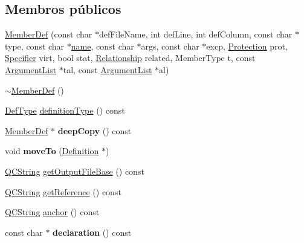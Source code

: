 \subsection*{Membros públicos}
\begin{DoxyCompactItemize}
\item 
\hyperlink{class_member_def_a99a23c621060bfd3d01cf65d5c235011}{Member\-Def} (const char $\ast$def\-File\-Name, int def\-Line, int def\-Column, const char $\ast$type, const char $\ast$\hyperlink{class_definition_a2c310e06c9aadc6fb218f80fcbb5c695}{name}, const char $\ast$args, const char $\ast$excp, \hyperlink{types_8h_a90e352184df58cd09455fe9996cd4ded}{Protection} prot, \hyperlink{types_8h_ab16236bdd10ddf4d73a9847350f0017e}{Specifier} virt, bool stat, \hyperlink{types_8h_a9d625fe894d9313ec78df1d78553f32e}{Relationship} related, Member\-Type t, const \hyperlink{class_argument_list}{Argument\-List} $\ast$tal, const \hyperlink{class_argument_list}{Argument\-List} $\ast$al)
\item 
\hyperlink{class_member_def_abf79fd4952640be8c59f27a53c56d0c9}{$\sim$\-Member\-Def} ()
\item 
\hyperlink{class_definition_intf_a2dc566dfec40397b2990e6520536ecb5}{Def\-Type} \hyperlink{class_member_def_aac410235a8bf90e471e649bd9dbf9c5e}{definition\-Type} () const 
\item 
\hypertarget{class_member_def_a58301c739a95a209f09029971dd02cf2}{\hyperlink{class_member_def}{Member\-Def} $\ast$ {\bfseries deep\-Copy} () const }\label{class_member_def_a58301c739a95a209f09029971dd02cf2}

\item 
\hypertarget{class_member_def_a8afcab28f955d5caad49d4b0bdd0fb2c}{void {\bfseries move\-To} (\hyperlink{class_definition}{Definition} $\ast$)}\label{class_member_def_a8afcab28f955d5caad49d4b0bdd0fb2c}

\item 
\hyperlink{class_q_c_string}{Q\-C\-String} \hyperlink{class_member_def_af72a982ba8198cd5c98e9fc850b71df6}{get\-Output\-File\-Base} () const 
\item 
\hyperlink{class_q_c_string}{Q\-C\-String} \hyperlink{class_member_def_a87b81ea7f17740033bf8fb12f796c494}{get\-Reference} () const 
\item 
\hyperlink{class_q_c_string}{Q\-C\-String} \hyperlink{class_member_def_acd17ae1d9600f864b1beb85dfb99a4f4}{anchor} () const 
\item 
\hypertarget{class_member_def_a849fb32859fc1b0d0b3def83e2141de9}{const char $\ast$ {\bfseries declaration} () const }\label{class_member_def_a849fb32859fc1b0d0b3def83e2141de9}


\end{DoxyCompactItemize}
